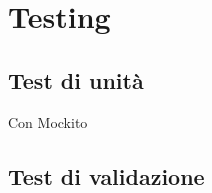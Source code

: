 
\chapter{Testing}
\label{cap:realizzazione-testing}

\section{Test di unità}

Con Mockito 

\section{Test di validazione}


